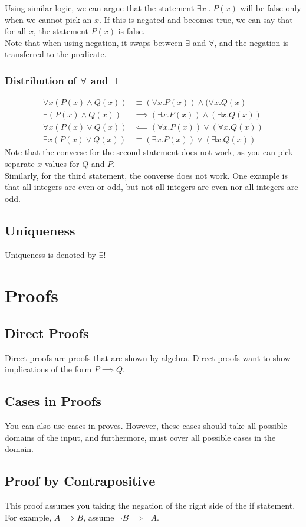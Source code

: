 \documentclass[a4paper]{article}
\theoremstyle{plain}
\theoremstyle{definition}
\theoremstyle{remark}
\begin{document}
Using similar logic, we can argue that the statement $\exists x \; . \; P(x)$ will be false only when we cannot pick an $x$. If this is negated and becomes true, we can say that  for all $x$, the statement $P(x)$ is false. \\
Note that when using negation, it swaps between $\exists $ and $\forall $, and the negation is transferred to the predicate.

\subsubsection{Distribution of $\forall $ and $\exists $}
\begin{align*}
	\forall x (P(x) \land Q(x))& \equiv (\forall x. P(x)) \land ( \forall x. Q(x)\\
	\exists (P(x) \land Q(x)) &\implies (\exists x . P(x)) \land (\exists x . Q(x))\\
	\forall x (P(x) \lor Q(x)) &\impliedby (\forall x . P(x)) \lor (\forall x . Q(x))\\
	\exists x (P(x) \lor Q(x)) &\equiv (\exists x. P(x)) \lor( \exists x. Q(x))
\end{align*}
Note that the converse for the second statement does not work, as you can pick separate $x$ values for $Q$ and $P$. \\
Similarly, for the third statement, the converse does not work. One example is that all integers are even or odd, but not all integers are even nor all integers are odd.
\subsection{Uniqueness}
Uniqueness is denoted by $\exists !$
\section{Proofs}
\subsection{Direct Proofs}
Direct proofs are proofs that are shown by algebra. Direct proofs want to show implications of the form $P \implies Q$.
\subsection{Cases in Proofs}
You can also use cases in proves. However, these cases should take all possible domains of the input, and furthermore, must cover all possible cases in the domain.
\subsection{Proof by Contrapositive}
This proof assumes you taking the negation of the right side of the if statement. For example, $A \implies B$, assume $\neg B \implies \neg A$. 
\end{document}
